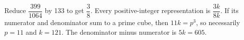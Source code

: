 Reduce $\dfrac{399}{1064}$ by 133 to get $\dfrac{3}{8}$. Every positive-integer representation is $\dfrac{3k}{8k}$. If its numerator and denominator sum to a prime cube, then $11k=p^3$, so necessarily $p=11$ and $k=121$. The denominator minus numerator is $5k=\boxed{605}$.
